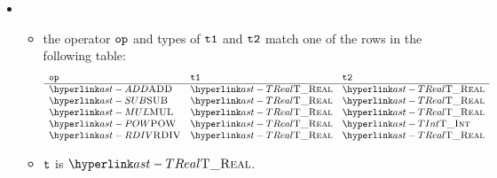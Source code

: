 \begin{itemize}
  \item {}
  \begin{itemize}
    \item the operator $\texttt{op}$ and types of $\texttt{t1}$ and $\texttt{t2}$ match one of the rows in the following table:
    \[
    \begin{array}{lll}
      \mathbf{\op} & \mathbf{\vtone} & \mathbf{\vttwo} \\
      \hline
      \ADD  & \TReal    & \TReal\\
      \SUB & \TReal    & \TReal\\
      \MUL   & \TReal    & \TReal\\
      \POW   & \TReal    & \TInt\\
      \RDIV  & \TReal    & \TReal
    \end{array}
    \]
    \item $\texttt{t}$ is $\TReal$.
  \end{itemize}


\end{itemize}
